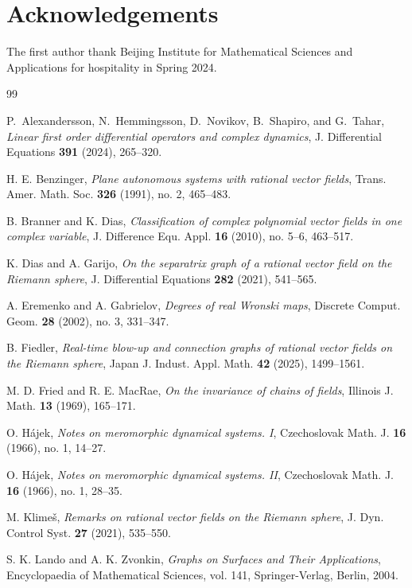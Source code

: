 \documentclass[11pt,reqno]{amsart}
\theoremstyle{definition}
\theoremstyle{remark}
\begin{document}
\section*{Acknowledgements}
The first author thank Beijing Institute for Mathematical Sciences and Applications for hospitality in Spring 2024.  

\begin{thebibliography}{99}

P.~Alexandersson, N.~Hemmingsson, D.~Novikov, B.~Shapiro, and G.~Tahar,
\emph{Linear first order differential operators and complex dynamics},
J. Differential Equations \textbf{391} (2024), 265--320.

H. E. Benzinger,
\emph{Plane autonomous systems with rational vector fields},
Trans. Amer. Math. Soc. \textbf{326} (1991), no. 2, 465--483.

B. Branner and K. Dias,
\emph{Classification of complex polynomial vector fields in one complex variable},
J. Difference Equ. Appl. \textbf{16} (2010), no. 5--6, 463--517.

K. Dias and A. Garijo,
\emph{On the separatrix graph of a rational vector field on the Riemann sphere},
J. Differential Equations \textbf{282} (2021), 541--565.

A. Eremenko and A. Gabrielov,
\emph{Degrees of real Wronski maps},
Discrete Comput. Geom. \textbf{28} (2002), no. 3, 331--347.

B. Fiedler,
\emph{Real-time blow-up and connection graphs of rational vector fields on the Riemann sphere},
Japan J. Indust. Appl. Math. \textbf{42} (2025), 1499--1561.

M. D. Fried and R. E. MacRae,
\emph{On the invariance of chains of fields},
Illinois J. Math. \textbf{13} (1969), 165--171.

O. H\'ajek,
\emph{Notes on meromorphic dynamical systems. I},
Czechoslovak Math. J. \textbf{16} (1966), no. 1, 14--27.

O. H\'ajek,
\emph{Notes on meromorphic dynamical systems. II},
Czechoslovak Math. J. \textbf{16} (1966), no. 1, 28--35.

M. Klime\v{s},
\emph{Remarks on rational vector fields on the Riemann sphere},
J. Dyn. Control Syst. \textbf{27} (2021), 535--550.

S. K. Lando and A. K. Zvonkin,
\emph{Graphs on Surfaces and Their Applications},
Encyclopaedia of Mathematical Sciences, vol. 141, Springer-Verlag, Berlin, 2004.


\end{thebibliography}
\end{document}
